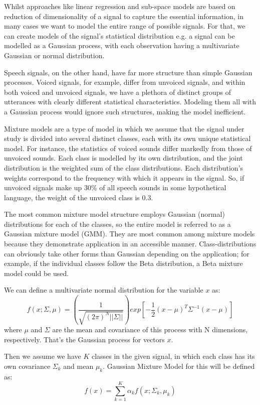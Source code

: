 Whilst approaches like linear regression and sub-space models are based on reduction of dimensionality of a signal to capture the essential information, in many cases we want to model the entire range of possible signals. For that, we can create models of the signal's statistical distribution e.g. a signal can be modelled as a Gaussian process, with each observation having a multivariate Gaussian or normal distribution.

Speech signals, on the other hand, have far more structure than simple Gaussian processes. Voiced signals, for example, differ from unvoiced signals, and within both voiced and unvoiced signals, we have a plethora of distinct groups of utterances with clearly different statistical characteristics. Modeling them all with a Gaussian process would ignore such structures, making the model inefficient.

Mixture models are a type of model in which we assume that the signal under study is divided into several distinct classes, each with its own unique statistical model. For instance, the statistics of voiced sounds differ markedly from those of unvoiced sounds. Each class is modelled by its own distribution, and the joint distribution is the weighted sum of the class distributions. Each distribution's weights correspond to the frequency with which it appears in the signal. So, if unvoiced signals make up 30\% of all speech sounds in some hypothetical language, the weight of the unvoiced class is 0.3.

The most common mixture model structure employs Gaussian (normal) distributions for each of the classes, so the entire model is referred to as a Gaussian mixture model (GMM). They are most common among mixture models because they demonstrate application in an accessible manner. Class-distributions can obviously take other forms than Gaussian depending on the application; for example, if the individual classes follow the Beta distribution, a Beta mixture model could be used. 

We can define a multivariate normal distribution for the variable $x$ as:
\begin{equation}
    f(x;\Sigma,\mu) = \left(\frac{1}{\sqrt{(2\pi)^N ||\Sigma||}}\right) exp\left[-\frac{1}{2}(x-\mu)^T\Sigma^{-1}(x-\mu)\right]
\end{equation}
where $\mu$ and $\Sigma$  are the mean and covariance of this process with N dimensions, respectively. That's the Gaussian process for vectors $x$.

Then we assume we have $K$ classes in the given signal, in which each class has its own covariance $\Sigma_{k}$ and mean $\mu_{k}$. Gaussian Mixture Model for this will be defined as:
\begin{equation}
    f(x)=\sum_{k=1}^{K} \alpha_{k} f(x;\Sigma_{k},\mu_{k})     
\end{equation}

